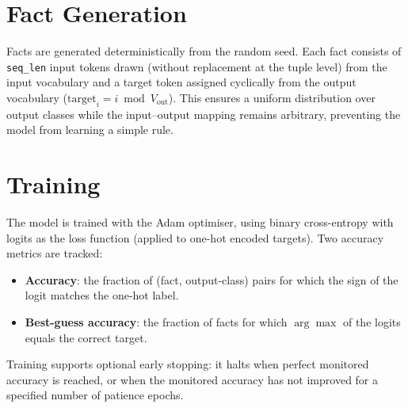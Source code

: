 \documentclass[11pt,a4paper]{article}
\begin{document}
\section{Fact Generation}

Facts are generated deterministically from the random seed. Each fact consists of \texttt{seq\_len} input tokens drawn (without replacement at the tuple level) from the input vocabulary and a target token assigned cyclically from the output vocabulary ($\text{target}_i = i \bmod V_\text{out}$). This ensures a uniform distribution over output classes while the input--output mapping remains arbitrary, preventing the model from learning a simple rule.


\section{Training}

The model is trained with the Adam optimiser, using binary cross-entropy with logits as the loss function (applied to one-hot encoded targets). Two accuracy metrics are tracked:
\begin{itemize}[nosep]
    \item \textbf{Accuracy}: the fraction of (fact, output-class) pairs for which the sign of the logit matches the one-hot label.
    \item \textbf{Best-guess accuracy}: the fraction of facts for which $\arg\max$ of the logits equals the correct target.
\end{itemize}
Training supports optional early stopping: it halts when perfect monitored accuracy is reached, or when the monitored accuracy has not improved for a specified number of patience epochs.
\end{document}
